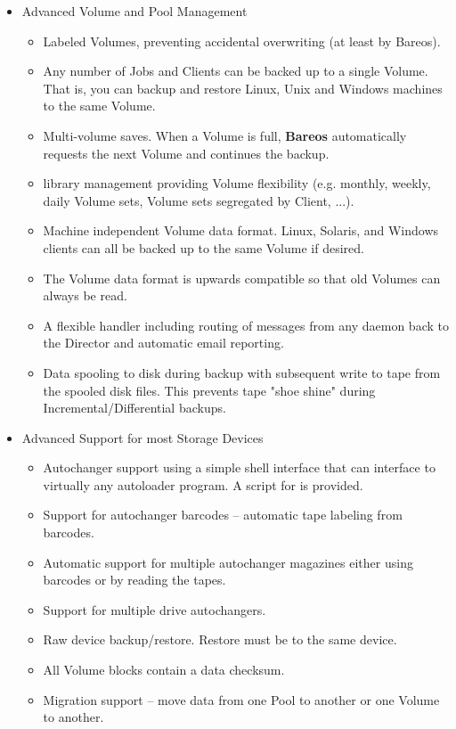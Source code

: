 \begin{itemize}
\item Advanced Volume and Pool Management
   \begin{itemize}
   \item Labeled Volumes, preventing accidental overwriting  (at least by
      Bareos).
   \item Any number of Jobs and Clients can be backed up to a single  Volume.
      That is, you can backup and restore Linux, Unix and  Windows machines to
      the same Volume.
   \item Multi-volume saves. When a Volume is full, {\bf Bareos}  automatically
      requests the next Volume and continues the backup.
   \item
       library management
      providing Volume flexibility (e.g. monthly, weekly, daily Volume sets,  Volume
      sets segregated by Client, ...).
   \item Machine independent Volume data format. Linux, Solaris, and Windows
      clients can all be backed up to the same Volume if desired.
   \item The Volume data format is upwards compatible so that old Volumes
      can always be read.
   \item A flexible
        handler including routing
      of messages from any daemon back to the  Director and automatic email
      reporting.
   \item Data spooling to disk during backup with subsequent write to tape from
      the spooled disk files. This prevents tape "shoe shine"  during
      Incremental/Differential backups.
   \end{itemize}

\item Advanced Support for most Storage Devices
    \begin{itemize}
   \item Autochanger support using a simple shell interface that can interface
      to virtually any autoloader program. A script for  is  provided.
   \item Support for autochanger barcodes -- automatic tape labeling from
      barcodes.
   \item Automatic support for multiple autochanger magazines either using
      barcodes or by reading the tapes.
   \item Support for multiple drive autochangers.
   \item Raw device backup/restore. Restore must be to the same device.
   \item All Volume blocks contain a data checksum.
   \item Migration support -- move data from one Pool to another or
         one Volume to another.
   \end{itemize}


\end{itemize}
